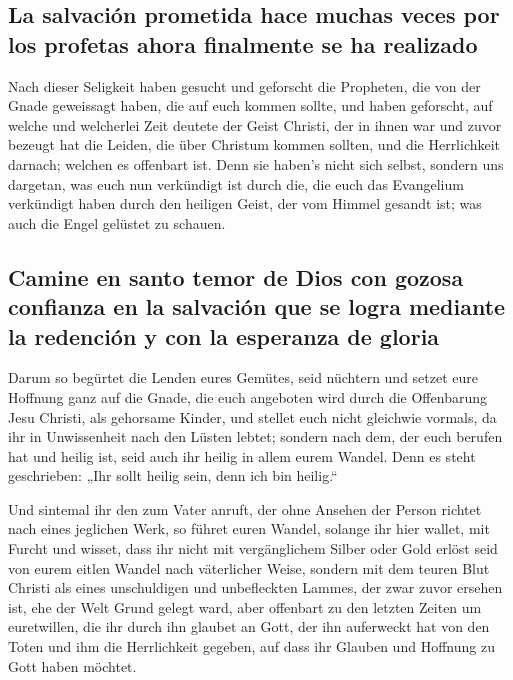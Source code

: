\hypertarget{la-salvaciuxf3n-prometida-hace-muchas-veces-por-los-profetas-ahora-finalmente-se-ha-realizado}{%
\subsection{La salvación prometida hace muchas veces por los profetas
ahora finalmente se ha
realizado}\label{la-salvaciuxf3n-prometida-hace-muchas-veces-por-los-profetas-ahora-finalmente-se-ha-realizado}}

 Nach dieser Seligkeit haben gesucht und geforscht die
Propheten, die von der Gnade geweissagt haben, die auf euch kommen
sollte,  und haben geforscht, auf welche und welcherlei
Zeit deutete der Geist Christi, der in ihnen war und zuvor bezeugt hat
die Leiden, die über Christum kommen sollten, und die Herrlichkeit
darnach;  welchen es offenbart ist. Denn sie haben's
nicht sich selbst, sondern uns dargetan, was euch nun verkündigt ist
durch die, die euch das Evangelium verkündigt haben durch den heiligen
Geist, der vom Himmel gesandt ist; was auch die Engel gelüstet zu
schauen.

\hypertarget{camine-en-santo-temor-de-dios-con-gozosa-confianza-en-la-salvaciuxf3n-que-se-logra-mediante-la-redenciuxf3n-y-con-la-esperanza-de-gloria}{%
\subsection{Camine en santo temor de Dios con gozosa confianza en la
salvación que se logra mediante la redención y con la esperanza de
gloria}\label{camine-en-santo-temor-de-dios-con-gozosa-confianza-en-la-salvaciuxf3n-que-se-logra-mediante-la-redenciuxf3n-y-con-la-esperanza-de-gloria}}

 Darum so begürtet die Lenden eures Gemütes, seid
nüchtern und setzet eure Hoffnung ganz auf die Gnade, die euch angeboten
wird durch die Offenbarung Jesu Christi,  als gehorsame
Kinder, und stellet euch nicht gleichwie vormals, da ihr in Unwissenheit
nach den Lüsten lebtet;  sondern nach dem, der euch
berufen hat und heilig ist, seid auch ihr heilig in allem eurem Wandel.
 Denn es steht geschrieben: „Ihr sollt heilig sein, denn
ich bin heilig.``

 Und sintemal ihr den zum Vater anruft, der ohne Ansehen
der Person richtet nach eines jeglichen Werk, so führet euren Wandel,
solange ihr hier wallet, mit Furcht  und wisset, dass ihr
nicht mit vergänglichem Silber oder Gold erlöst seid von eurem eitlen
Wandel nach väterlicher Weise,  sondern mit dem teuren
Blut Christi als eines unschuldigen und unbefleckten Lammes,
 der zwar zuvor ersehen ist, ehe der Welt Grund gelegt
ward, aber offenbart zu den letzten Zeiten um euretwillen,
 die ihr durch ihn glaubet an Gott, der ihn auferweckt
hat von den Toten und ihm die Herrlichkeit gegeben, auf dass ihr Glauben
und Hoffnung zu Gott haben möchtet.

